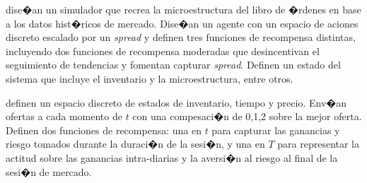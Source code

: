 \documentclass[12pt,a4paper,spanish]{article}%
\begin{document}
\cite{Spooner2018} dise�an un simulador que recrea la microestructura del libro de �rdenes en base a los datos hist�ricos de mercado. Dise�an un agente con un espacio de aciones discreto escalado por un \textit{spread} y definen tres funciones de recompensa distintas, incluyendo dos funciones de recompensa moderadas que desincentivan el seguimiento de tendencias y fomentan capturar \textit{spread}. Definen un estado del sistema que incluye el inventario y la microestructura, entre otros.

\cite{Lim2018} definen un espacio discreto de estados de inventario, tiempo y precio. Env�an ofertas a cada momento de $t$ con una compesaci�n de {0,1,2} sobre la mejor oferta. Definen dos funciones de recompensa: una en $t$ para capturar las ganancias y riesgo tomados durante la duraci�n de la sesi�n, y una en $T$ para representar la actitud sobre las ganancias intra-diarias y la aversi�n al riesgo al final de la sesi�n de mercado.

\end{document}
